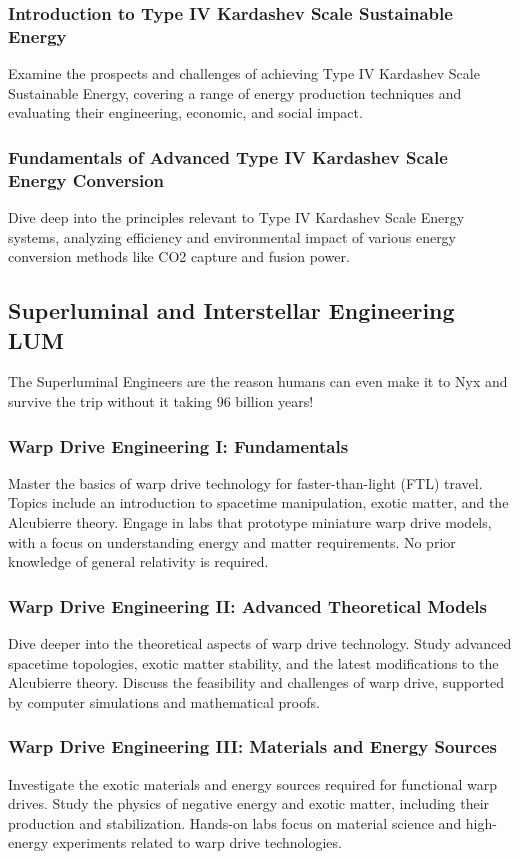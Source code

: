 \subsubsection{Introduction to Type IV Kardashev Scale Sustainable Energy}
Examine the prospects and challenges of achieving Type IV Kardashev Scale Sustainable Energy, covering a range of energy production techniques and evaluating their engineering, economic, and social impact.
\subsubsection{Fundamentals of Advanced Type IV Kardashev Scale Energy Conversion}
Dive deep into the principles relevant to Type IV Kardashev Scale Energy systems, analyzing efficiency and environmental impact of various energy conversion methods like CO2 capture and fusion power.

\subsection{Superluminal and Interstellar Engineering \hfill LUM}
The Superluminal Engineers are the reason humans can even make it to Nyx and survive the trip without it taking 96 billion years!
\subsubsection{Warp Drive Engineering I: Fundamentals}
Master the basics of warp drive technology for faster-than-light (FTL) travel. Topics include an introduction to spacetime manipulation, exotic matter, and the Alcubierre theory. Engage in labs that prototype miniature warp drive models, with a focus on understanding energy and matter requirements. No prior knowledge of general relativity is required.
\subsubsection{Warp Drive Engineering II: Advanced Theoretical Models}
Dive deeper into the theoretical aspects of warp drive technology. Study advanced spacetime topologies, exotic matter stability, and the latest modifications to the Alcubierre theory. Discuss the feasibility and challenges of warp drive, supported by computer simulations and mathematical proofs.
\subsubsection{Warp Drive Engineering III: Materials and Energy Sources}
Investigate the exotic materials and energy sources required for functional warp drives. Study the physics of negative energy and exotic matter, including their production and stabilization. Hands-on labs focus on material science and high-energy experiments related to warp drive technologies.
